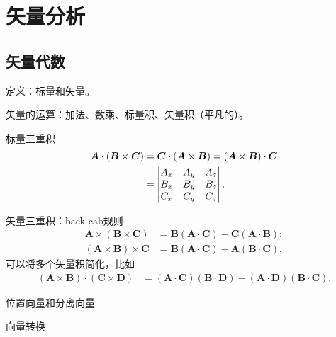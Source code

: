 
\chapter{矢量分析}
\label{chap:vector analysis}

\section{矢量代数}

\begin{compactitem}
	\item 定义：标量和矢量。
	\item 矢量的运算：加法、数乘、标量积、矢量积（平凡的）。
	\item 标量三重积
    \begin{align}
        \bm A\cdot(\bm B\times\bm C)&=\bm C\cdot(\bm A\times\bm B)=(\bm A\times\bm B)\cdot\bm C\\\notag
        &=\begin{vmatrix}
            A_x&A_y&A_z\\
            B_x&B_y&B_z\\
            C_x&C_y&C_z
        \end{vmatrix}.
    \end{align}
    \item 矢量三重积：back cab规则
    \begin{align}
        \label{eqn:bac-cab}
        \bm A\times(\bm B\times\bm C)&=\bm B(\bm A\cdot\bm C)-\bm C(\bm A\cdot\bm B);\\
        (\bm A\times\bm B)\times\bm C&=\bm B(\bm A\cdot\bm C)-\bm A(\bm B\cdot\bm C).
    \end{align}
    可以将多个矢量积简化，比如
    \begin{align*}
        (\bm A\times\bm B)\cdot(\bm C\times\bm D)&=(\bm A\cdot\bm C)(\bm B\cdot\bm D)-(\bm A\cdot\bm D)(\bm B\cdot\bm C).
    \end{align*}
    \item 位置向量和分离向量
    \item 向量转换
\end{compactitem}
